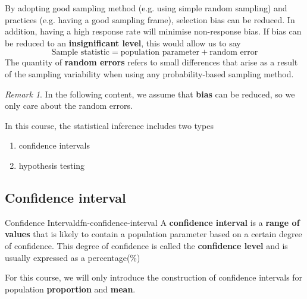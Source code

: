 \documentclass[math,code]{amznotes}
\theoremstyle{remark}
\newtheorem*{remark}{Remark}
\begin{document}
By adopting good sampling method (e.g. using simple random sampling) and practices (e.g. having a good sampling frame), selection bias can be reduced. In addition, having a high response rate will minimise non-response bias. If bias can be reduced to an \textbf{insignificant level}, this would allow us to say
\begin{equation*}
    \text{Sample statistic}=\text{population parameter}+\text{random error}
\end{equation*}
The quantity of \textbf{random errors} refers to small differences that arise as a result of the sampling variability when using any probability-based sampling method.
\begin{notebox}
    \begin{remark}
        In the following content, we assume that \textbf{bias} can be reduced, so we only care about the random errors.
    \end{remark}
\end{notebox}
In this course, the statistical inference includes two types
\begin{enumerate}
    \item confidence intervals
    \item hypothesis testing
\end{enumerate}

\subsection{Confidence interval}
\begin{dfnbox}{Confidence Interval}{dfn-confidence-interval}
    A {\color{red} \textbf{confidence interval}} is a \textbf{range of values} that is likely to contain a population parameter based on a certain degree of confidence. This degree of confidence is called the \textbf{confidence level} and is usually expressed as a percentage(\%)
\end{dfnbox}
For this course, we will only introduce the construction of confidence intervals for population \textbf{proportion} and \textbf{mean}.
\end{document}
